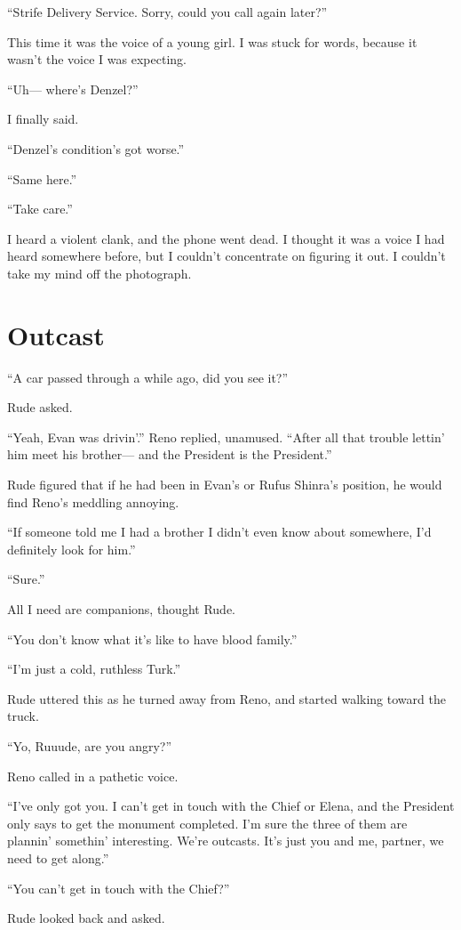 \documentclass[oneside]{book}
\begin{document}
“Strife Delivery Service. Sorry, could you call again later?”

This time it was the voice of a young girl. I was stuck for words, because it wasn’t the voice I was expecting.

“Uh— where’s Denzel?”

I finally said.

“Denzel’s condition’s got worse.”

“Same here.”

“Take care.”

I heard a violent clank, and the phone went dead. I thought it was a voice I had heard somewhere before, but I couldn’t concentrate on figuring it out. I couldn’t take my mind off the photograph.

\chapter{Outcast}
“A car passed through a while ago, did you see it?”

Rude asked.

“Yeah, Evan was drivin’.” Reno replied, unamused. “After all that trouble lettin’ him meet his brother— and the President is the President.”

Rude figured that if he had been in Evan’s or Rufus Shinra’s position, he would find Reno’s meddling annoying.

“If someone told me I had a brother I didn’t even know about somewhere, I’d definitely look for him.”

“Sure.”

All I need are companions, thought Rude.

“You don’t know what it’s like to have blood family.”

“I’m just a cold, ruthless Turk.”

Rude uttered this as he turned away from Reno, and started walking toward the truck.

“Yo, Ruuude, are you angry?”

Reno called in a pathetic voice.

“I’ve only got you. I can’t get in touch with the Chief or Elena, and the President only says to get the monument completed. I’m sure the three of them are plannin’ somethin’ interesting. We’re outcasts. It’s just you and me, partner, we need to get along.”

“You can’t get in touch with the Chief?”

Rude looked back and asked.
\end{document}
